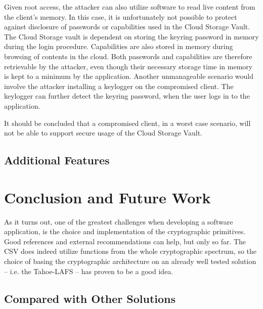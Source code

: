 \documentclass[pdftex,english,10pt,b5paper,twoside]{book}
\begin{document}
Given root access, the attacker can also utilize software to read live content
from the client's memory. In this case, it is unfortunately not possible to protect against
disclosure of passwords or capabilities used in the Cloud Storage Vault. The
Cloud Storage vault is dependent on storing the keyring password in memory
during the login procedure. Capabilities are also stored in memory during
browsing of contents in the cloud. Both passwords and capabilities are therefore
retrievable by the attacker, even though their necessary storage time in memory is kept to a
minimum by the application. Another unmanageable scenario would involve the
attacker installing a keylogger on the compromised client. The keylogger can
further detect the keyring password, when the user logs in to the application.

It should be concluded that a compromised client, in a worst case scenario, will not be able
to support secure usage of the Cloud Storage Vault.



\section{Additional Features}


\chapter{Conclusion and Future Work}
\label{ch:conclusion}

As it turns out, one of the greatest challenges when developing a software
application, is the choice and implementation of the cryptographic primitives.
Good references and external recommendations can help, but only so far.
The \ac{CSV} does indeed utilize functions from the whole cryptographic
spectrum, so the choice of basing the cryptographic architecture on an already
well tested solution -- i.e. the Tahoe-\ac{LAFS} -- has proven to be a good
idea.

\section{Compared with Other Solutions}


\end{document}
